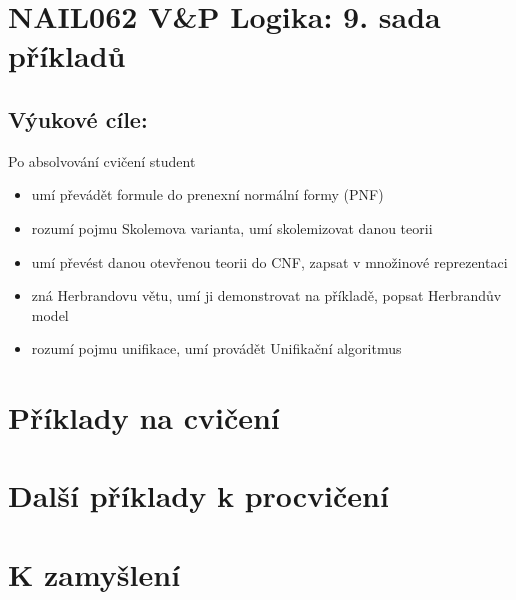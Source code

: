 \section*{NAIL062 V\&P Logika: 9. sada příkladů}


\subsection*{Výukové cíle:} Po absolvování cvičení student

    \begin{itemize}\setlength{\itemsep}{0pt}
        \item umí převádět formule do prenexní normální formy (PNF)
        \item rozumí pojmu Skolemova varianta, umí skolemizovat danou teorii
        \item umí převést danou otevřenou teorii do CNF, zapsat v množinové reprezentaci
        \item zná Herbrandovu větu, umí ji demonstrovat na příkladě, popsat Herbrandův model
        \item rozumí pojmu unifikace, umí provádět Unifikační algoritmus
    \end{itemize}
    

\section*{Příklady na cvičení}


\begin{problem}


    \begin{solution}
                    
    \end{solution}

\end{problem}

        
        
\section*{Další příklady k procvičení}

        
\section*{K zamyšlení}


